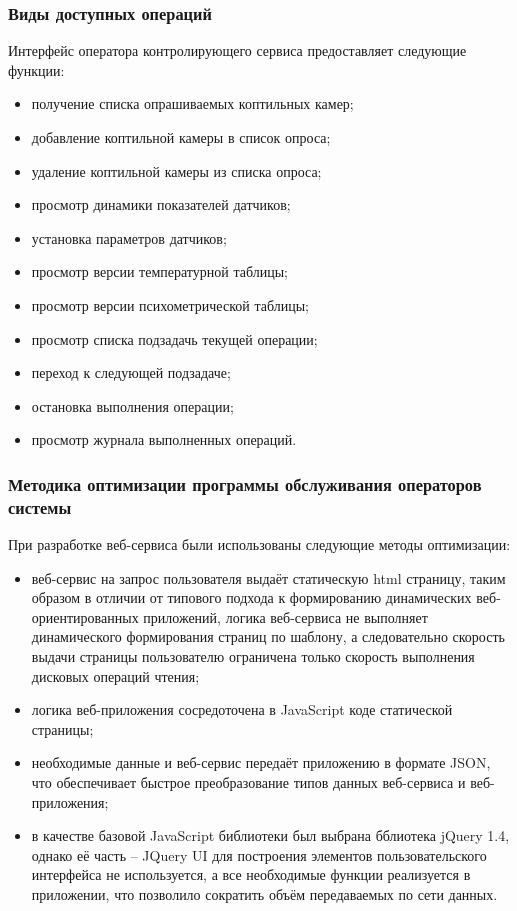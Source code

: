 \subsubsection{Виды доступных операций}
Интерфейс оператора контролирующего сервиса предоставляет следующие функции:
\begin{itemize}
	\item получение списка опрашиваемых коптильных камер;
	\item добавление коптильной камеры в список опроса;
	\item удаление коптильной камеры из списка опроса;
	\item просмотр динамики показателей датчиков;
	\item установка параметров датчиков;
	\item просмотр версии температурной таблицы;
	\item просмотр версии психометрической таблицы;
	\item просмотр списка подзадачь текущей операции;
	\item переход к следующей подзадаче;
	\item остановка выполнения операции;
	\item просмотр журнала выполненных операций.
\end{itemize}

\subsubsection{Методика оптимизации программы обслуживания операторов системы}

При разработке веб-сервиса были использованы следующие методы оптимизации:
\begin{itemize}
	\item веб-сервис на запрос пользователя выдаёт статическую html страницу, таким образом
		в отличии от типового подхода к формированию динамических веб-ориентированных приложений,
		логика веб-сервиса не выполняет динамического формирования страниц по шаблону, а следовательно
		скорость выдачи страницы пользователю ограничена только скорость выполнения дисковых операций чтения;
	\item логика веб-приложения сосредоточена в JavaScript коде статической страницы;
	\item необходимые данные и веб-сервис передаёт приложению в формате JSON,
	что обеспечивает быстрое преобразование типов данных веб-сервиса и веб-приложения;
	\item в качестве базовой JavaScript библиотеки был выбрана бблиотека jQuery 1.4, однако её часть -- JQuery UI
	для построения элементов пользовательского интерфейса не используется, а все необходимые функции реализуется
	в приложении, что позволило сократить объём передаваемых по сети данных.
\end{itemize}


